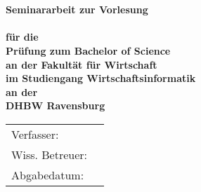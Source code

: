 \begin{titlepage}
	\begin{center}
		\vspace*{2cm}
		\LARGE\bf\myTopic\\
		\Large\rm\mySubTopic\\
		\vspace*{3cm}
		\bf Seminararbeit zur Vorlesung\\
		\myVorlesung\\
		\normalsize\rm
		\vspace*{0.5cm}\singlespacing
		für die\\
		Prüfung zum Bachelor of Science\\
		\vspace*{0.5cm}\singlespacing
		an der Fakultät für Wirtschaft\\
		im Studiengang Wirtschaftsinformatik\\
		\vspace*{0.5cm}\singlespacing
		an der\\
		DHBW Ravensburg
		\vfill
	\end{center}
	\begin{tabular}{ll}
		Verfasser:&\myAutor\\
		Wiss. Betreuer:&\myProf\\
		Abgabedatum:&\myEndDate\\
	\end{tabular}
\end{titlepage}
\newpage
\setcounter{page}{2}
